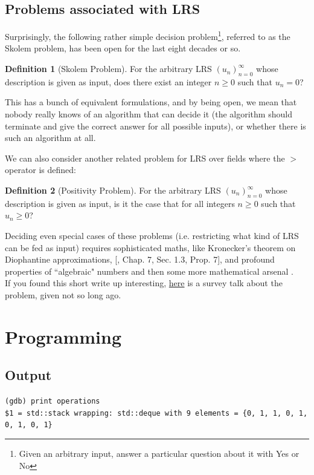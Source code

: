 \documentclass[answers]{exam}
\theoremstyle{definition}
\newtheorem{definition}{Definition}[section]
\newcommand{\term}[0]{(u_n)_{n=0}^\infty}
\begin{document}
\subsection{Problems associated with LRS}
Surprisingly, the following rather simple decision problem\footnote{Given an arbitrary input, answer a particular question about it with Yes or No}, referred to as the Skolem problem, has been open for the last eight decades or so.
\begin{definition}[Skolem Problem]
 For the arbitrary LRS $\term$ whose description is given as input, does there exist an integer $n \geq 0$ such that $u_n = 0$?
\end{definition}
This has a bunch of equivalent formulations, and by being open, we mean that nobody really knows of an algorithm that can decide it (the algorithm should terminate and give the correct answer for all possible inputs), or whether there is such an algorithm at all. 

We can also consider another related problem for LRS over fields where the $>$ operator is defined:
\begin{definition}[Positivity Problem]
  For the arbitrary LRS $\term$ whose description is given as input, is it the case that for all integers $n \geq 0$ such that $u_n \geq 0$?
\end{definition}
Deciding even special cases of these problems (i.e. restricting what kind of LRS can be fed as
input) requires sophisticated maths, like Kronecker's theorem on Diophantine approximations, [\cite{bourbaki1966elements},
Chap. 7, Sec. 1.3, Prop. 7], and profound properties of ``algebraic" numbers \cite{mignotte1982some} and then some more mathematical arsenal \cite{bell2007positivity, renegar1992computational}. \\

If you found this short write up interesting, \href{https://fmindia.cmi.ac.in/update2013/presentations/S-Akshay.pdf}{here} is a survey talk about the problem, given not so long ago.
\section{Programming}
\subsection{Output}
\verb|(gdb) print operations|\\
\verb|$1 = std::stack wrapping: std::deque with 9 elements = {0, 1, 1, 0, 1, 0, 1, 0, 1}|
\end{document}
